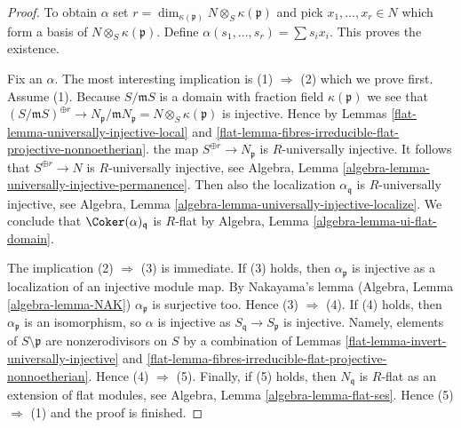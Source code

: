 \begin{proof}

To obtain $\alpha$ set
$r = \dim_{\kappa(\mathfrak p)} N \otimes_S \kappa(\mathfrak p)$ and pick
$x_1, \ldots, x_r \in N$ which form a basis of
$N \otimes_S \kappa(\mathfrak p)$. Define
$\alpha(s_1, \ldots, s_r) = \sum s_i x_i$. This proves the existence.

\medskip\noindent
Fix an $\alpha$. The most interesting implication is
(1) $\Rightarrow$ (2) which we prove first. Assume (1).
Because $S/\mathfrak mS$ is a domain with fraction field $\kappa(\mathfrak p)$
we see that
$(S/\mathfrak mS)^{\oplus r} \to
N_{\mathfrak p}/\mathfrak mN_{\mathfrak p} = N \otimes_S \kappa(\mathfrak p)$
is injective. Hence by
Lemmas \ref{flat-lemma-universally-injective-local} and
\ref{flat-lemma-fibres-irreducible-flat-projective-nonnoetherian}.
the map $S^{\oplus r} \to N_{\mathfrak p}$ is $R$-universally injective.
It follows that $S^{\oplus r} \to N$ is $R$-universally injective, see
Algebra, Lemma \ref{algebra-lemma-universally-injective-permanence}.
Then also the localization $\alpha_{\mathfrak q}$ is $R$-universally
injective, see
Algebra, Lemma \ref{algebra-lemma-universally-injective-localize}.
We conclude that $\Coker(\alpha)_{\mathfrak q}$ is $R$-flat by
Algebra, Lemma \ref{algebra-lemma-ui-flat-domain}.

\medskip\noindent
The implication (2) $\Rightarrow$ (3) is immediate. If (3) holds, then
$\alpha_{\mathfrak p}$ is injective as a localization of an injective
module map. By Nakayama's lemma
(Algebra, Lemma \ref{algebra-lemma-NAK})
$\alpha_{\mathfrak p}$ is surjective too. Hence (3) $\Rightarrow$ (4).
If (4) holds, then $\alpha_{\mathfrak p}$ is an isomorphism, so
$\alpha$ is injective as $S_{\mathfrak q} \to S_{\mathfrak p}$ is injective.
Namely, elements of $S \setminus \mathfrak p$ are nonzerodivisors on $S$
by a combination of
Lemmas \ref{flat-lemma-invert-universally-injective} and
\ref{flat-lemma-fibres-irreducible-flat-projective-nonnoetherian}.
Hence (4) $\Rightarrow$ (5). Finally, if (5) holds, then
$N_{\mathfrak q}$ is $R$-flat as an extension of flat modules, see
Algebra, Lemma \ref{algebra-lemma-flat-ses}.
Hence (5) $\Rightarrow$ (1) and the proof is finished.
\end{proof}

